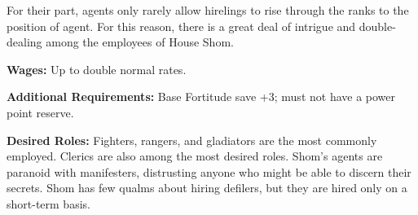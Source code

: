 For their part, agents only rarely allow hirelings to rise through the ranks to the position of agent. For this reason, there is a great deal of intrigue and double-dealing among the employees of House Shom.

\textbf{Wages:} Up to double normal rates.

\textbf{Additional Requirements:} Base Fortitude save +3; must not have a power point reserve.

\textbf{Desired Roles:} Fighters, rangers, and gladiators are the most commonly employed. Clerics are also among the most desired roles. Shom's agents are paranoid with manifesters, distrusting anyone who might be able to discern their secrets. Shom has few qualms about hiring defilers, but they are hired only on a short-term basis.